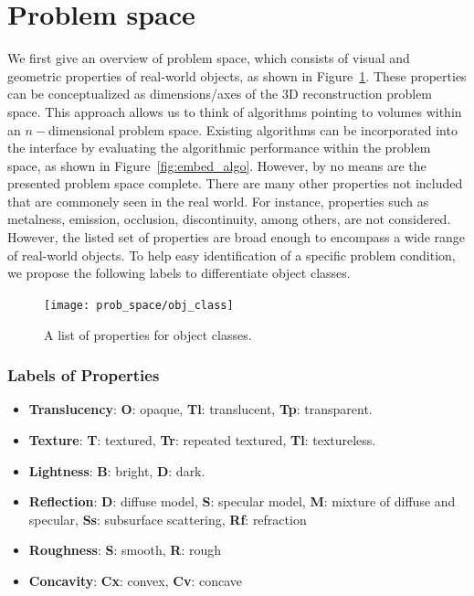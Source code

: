 \section{Problem space}
We first give an overview of problem space, which consists of visual and geometric properties of real-world objects, as shown in Figure~\ref{fig:obj_class}. These properties can be conceptualized as dimensions/axes of the 3D reconstruction problem space. This approach allows us to think of algorithms pointing to volumes within an $n-$dimensional problem space. Existing algorithms can be incorporated into the interface by evaluating the algorithmic performance within the problem space, as shown in Figure~\ref{fig:embed_algo}. However, by no means are the presented problem space complete. There are many other properties not included that are commonely seen in the real world. For instance, properties such as metalness, emission, occlusion, discontinuity, among others, are not considered. However, the listed set of properties are broad enough to encompass a wide range of real-world objects. To help easy identification of a specific problem condition, we propose the following labels to differentiate object classes.
\begin{figure}[!htbp]
\centering
\texttt{[image: prob\_space/obj\_class]}\\
\caption{A list of properties for object classes.}
\label{fig:obj_class}
\end{figure}

\subsubsection{Labels of Properties}
\begin{itemize}
\item \textbf{Translucency}: \textbf{O}: opaque, \textbf{Tl}: translucent, \textbf{Tp}: transparent.
\item \textbf{Texture}: \textbf{T}: textured, \textbf{Tr}: repeated textured, \textbf{Tl}: textureless.
\item \textbf{Lightness}: \textbf{B}: bright, \textbf{D}: dark.
\item \textbf{Reflection}: \textbf{D}: diffuse model, \textbf{S}: specular model, \textbf{M}: mixture of diffuse and specular, \textbf{Ss}: subsurface scattering, \textbf{Rf}: refraction
\item \textbf{Roughness}: \textbf{S}: smooth, \textbf{R}: rough
\item \textbf{Concavity}: \textbf{Cx}: convex, \textbf{Cv}: concave
\end{itemize}

